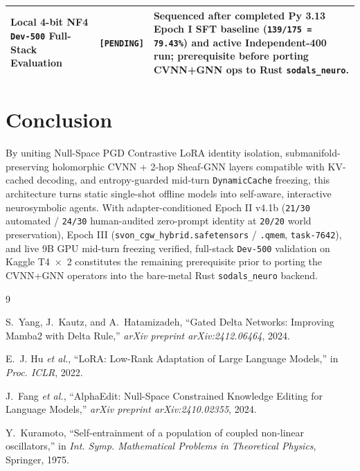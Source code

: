 \documentclass[11pt,a4paper]{article}
\begin{document}
\begin{table}[t]
\begin{tabular}{@{}p{4.8cm}p{2.2cm}p{7.4cm}@{}}
Local 4-bit NF4 \texttt{Dev-500} Full-Stack Evaluation & \texttt{[PENDING]} & Sequenced after completed Py 3.13 Epoch I SFT baseline (\texttt{139/175 = 79.43\%}) and active Independent-400 run; prerequisite before porting CVNN+GNN ops to Rust \texttt{sodals\_neuro}. \\
\bottomrule
\end{tabular}
\end{table}

\section{Conclusion}

By uniting Null-Space PGD Contrastive LoRA identity isolation, submanifold-preserving holomorphic CVNN + 2-hop Sheaf-GNN layers compatible with KV-cached decoding, and entropy-guarded mid-turn \texttt{DynamicCache} freezing, this architecture turns static single-shot offline models into self-aware, interactive neurosymbolic agents. With adapter-conditioned Epoch II v4.1b (\texttt{21/30} automated / \texttt{24/30} human-audited zero-prompt identity at \texttt{20/20} world preservation), Epoch III (\texttt{svon\_cgw\_hybrid.safetensors} / \texttt{.qmem}, \texttt{task-7642}), and live 9B GPU mid-turn freezing verified, full-stack \texttt{Dev-500} validation on Kaggle T4~$\times$~2 constitutes the remaining prerequisite prior to porting the CVNN+GNN operators into the bare-metal Rust \texttt{sodals\_neuro} backend.

\begin{thebibliography}{9}

S.~Yang, J.~Kautz, and A.~Hatamizadeh, ``Gated Delta Networks: Improving Mamba2 with Delta Rule,'' \textit{arXiv preprint arXiv:2412.06464}, 2024.

E.~J. Hu \textit{et al.}, ``LoRA: Low-Rank Adaptation of Large Language Models,'' in \textit{Proc. ICLR}, 2022.

J.~Fang \textit{et al.}, ``AlphaEdit: Null-Space Constrained Knowledge Editing for Language Models,'' \textit{arXiv preprint arXiv:2410.02355}, 2024.

Y.~Kuramoto, ``Self-entrainment of a population of coupled non-linear oscillators,'' in \textit{Int. Symp. Mathematical Problems in Theoretical Physics}, Springer, 1975.

\end{thebibliography}
\end{document}
